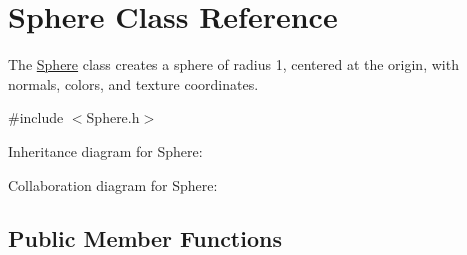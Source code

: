 \hypertarget{class_sphere}{}\section{Sphere Class Reference}
\label{class_sphere}


The \hyperlink{class_sphere}{Sphere} class creates a sphere of radius 1, centered at the origin, with normals, colors, and texture coordinates.  




{\ttfamily \#include $<$Sphere.\+h$>$}



Inheritance diagram for Sphere\+:


Collaboration diagram for Sphere\+:
\subsection*{Public Member Functions}
